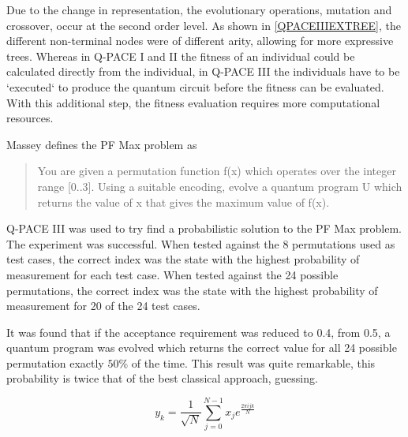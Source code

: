Due to the change in representation, the evolutionary operations, mutation and crossover, occur at the second order level.
As shown in \ref{QPACEIIIEXTREE}, the different non-terminal nodes were of different arity, allowing for more expressive trees.
Whereas in Q-PACE I and II the fitness of an individual could be calculated directly from the individual, in Q-PACE III the individuals have to be `executed` to produce the quantum circuit before the fitness can be evaluated.
With this additional step, the fitness evaluation requires more computational resources.

Massey defines the PF Max problem as
\begin{quote}
 You are given a permutation function f(x) which operates over the integer range [0..3].
Using a suitable encoding, evolve a quantum program U which returns the value of x that gives the maximum value of f(x).\cite{masseythesis}
\end{quote}
Q-PACE III was used to try find a probabilistic solution to the PF Max problem.
The experiment was successful.
When tested against the 8 permutations used as test cases, the correct index was the state with the highest probability of measurement for each test case.
When tested against the 24 possible permutations, the correct index was the state with the highest probability of measurement for 20 of the 24 test cases.

It was found that if the acceptance requirement was reduced to 0.4, from 0.5, a quantum program was evolved which returns the correct value for all 24 possible permutation exactly $50\%$ of the time.
This result was quite remarkable, this probability is twice that of the best classical approach, guessing.



\begin{equation}
 y_k = \frac{1}{\sqrt{N}} \sum_{j=0}^{N-1}{x_j}e^{\frac{2\pi{ijk}}{N}}
\label{QFTeqn}
\end{equation}


